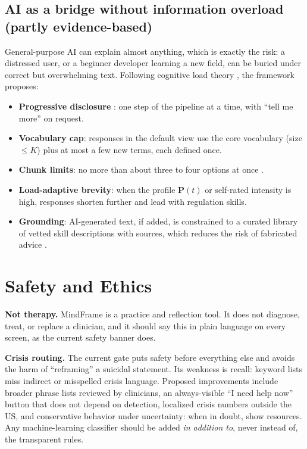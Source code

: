 \documentclass[11pt]{article}
\begin{document}
\subsection{AI as a bridge without information overload (partly evidence-based)}
General-purpose AI can explain almost anything, which is exactly the risk: a distressed user, or a beginner developer learning a new field, can be buried under correct but overwhelming text. Following cognitive load theory \citep{sweller1988}, the framework proposes:
\begin{itemize}
\item \textbf{Progressive disclosure} \citep{nielsen2006}: one step of the pipeline at a time, with ``tell me more'' on request.
\item \textbf{Vocabulary cap}: responses in the default view use the core vocabulary (size $\le K$) plus at most a few new terms, each defined once.
\item \textbf{Chunk limits}: no more than about three to four options at once \citep{cowan2001}.
\item \textbf{Load-adaptive brevity}: when the profile $\mathbf{P}(t)$ or self-rated intensity is high, responses shorten further and lead with regulation skills.
\item \textbf{Grounding}: AI-generated text, if added, is constrained to a curated library of vetted skill descriptions with sources, which reduces the risk of fabricated advice \citep{bommasani2021}.
\end{itemize}

\section{Safety and Ethics}\label{sec:safety}
\textbf{Not therapy.} MindFrame is a practice and reflection tool. It does not diagnose, treat, or replace a clinician, and it should say this in plain language on every screen, as the current safety banner does.

\textbf{Crisis routing.} The current gate puts safety before everything else and avoids the harm of ``reframing'' a suicidal statement. Its weakness is recall: keyword lists miss indirect or misspelled crisis language. Proposed improvements include broader phrase lists reviewed by clinicians, an always-visible ``I need help now'' button that does not depend on detection, localized crisis numbers outside the US, and conservative behavior under uncertainty: when in doubt, show resources. Any machine-learning classifier should be added \emph{in addition to}, never instead of, the transparent rules.
\end{document}

